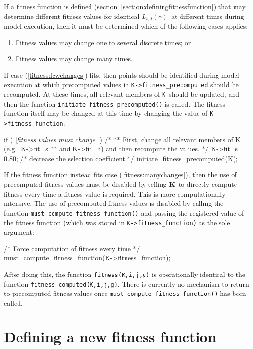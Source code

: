 \documentclass[10pt,twoside,a4paper,fleqn]{report}
\numberwithin{equation}{section}  %
\newcommand{\K}{{\bf K}}
\newcommand{\KK}{\mbox{{\tt K}}}  %
\newcommand{\Lijg}{\mbox{$L_{i,j}(\gamma)$}}     %
\begin{document}
{If a fitness function is defined (section~\ref{section:definingfitnessfunction}) that may determine different fitness values for identical \Lijg\ at different times during model execution, then it must be determined which of the following cases applies:
\begin{enumerate}
	\item\label{fitness:fewchanges} Fitness values may change one to several discrete times; or
	\item\label{fitness:manychanges} Fitness values may change many times. 
\end{enumerate}
If case (\ref{fitness:fewchanges}) fits, then points should be identified during model execution at which precomputed values in \lstinline{K->fitness_precomputed} should be recomputed.  At these times, all relevant members of \KK\ should be updated, and then the function \lstinline{initiate_fitness_precomputed()} is called.  The fitness function itself may be changed at this time by changing the value of \lstinline{K->fitness_function}:
\begin{C}[gobble=4,escapechar=|]
    if ( |{\it fitness values must change}| ) {
        /*
        ** First, change all relevant members of K (e.g., K->fit_s 
        ** and K->fit_h) and then recompute the values.
        */
        K->fit_s = 0.80;  /* decrease the selection coefficient */
        initiate_fitness_precomputed(K);
    }
\end{C}
If the fitness function instead fits case (\ref{fitness:manychanges}), then the use of precomputed fitness values must be disabled by telling \K\ to directly compute fitness every time a fitness value is required.  This is more computationally intensive.  The use of precomputed fitness values is disabled by calling the function \lstinline{must_compute_fitness_function()} and passing the registered value of the fitness function (which was stored in \lstinline{K->fitness_function)} as the sole argument:
\begin{C}[gobble=4]
    /* Force computation of fitness every time */
    must_compute_fitness_function(K->fitness_function);
\end{C}
After doing this, the function \lstinline{fitness(K,i,j,g)} is operationally identical to the function \lstinline{fitness_computed(K,i,j,g)}.  There is currently no mechanism to return to precomputed fitness values once \lstinline{must_compute_fitness_function()} has been called.

\section{Defining a new fitness function\label{section:definingfitnessfunction}}

}
\end{document}
